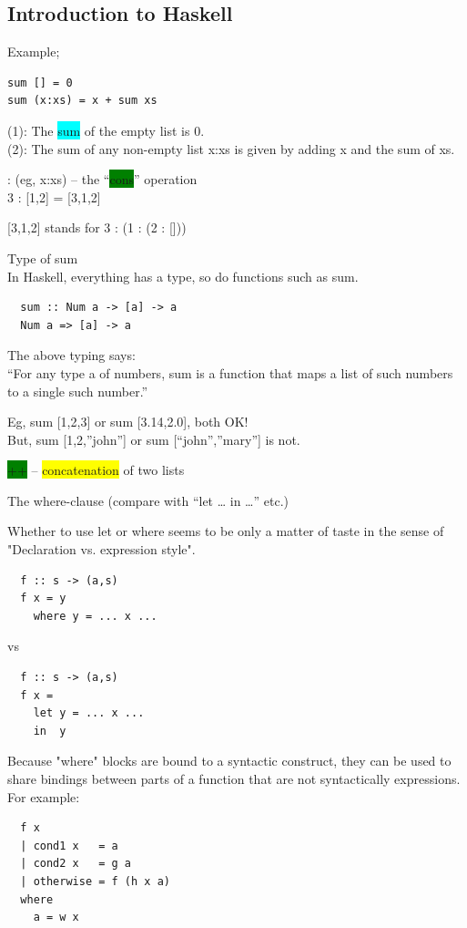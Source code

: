 \documentclass[tikz,border=10pt]{project_plan}
\begin{document}
\subsection{Introduction to Haskell}

Example;
\begin{lstlisting}
sum [] = 0
sum (x:xs) = x + sum xs
\end{lstlisting}
(1): The \colorbox{cyan}{sum} of the empty list is 0.\\
(2): The sum of any non-empty list x:xs is given by adding x and the sum of xs.

: (eg, x:xs) – the “\colorbox{green}{cons}” operation\\
3 : [1,2] = [3,1,2]

[3,1,2] stands for 3 : (1 : (2 : []))

Type of sum\\
In Haskell, everything has a type, so do functions such as sum.\\
\begin{lstlisting}
  sum :: Num a -> [a] -> a
  Num a => [a] -> a
\end{lstlisting}

The above typing says:\\
“For any type a of numbers, sum is a function that maps a
list of such numbers to a single such number.”

Eg, sum [1,2,3] or sum [3.14,2.0], both OK!\\
But, sum [1,2,”john”] or sum [“john”,”mary”] is not.

\colorbox{green}{++} – \colorbox{yellow}{concatenation} of two lists

The where-clause (compare with “let … in …” etc.)

Whether to use let or where seems to be only a matter of taste in the sense of
"Declaration vs. expression style".

\begin{lstlisting}
  f :: s -> (a,s)
  f x = y
    where y = ... x ...
\end{lstlisting}
vs
\begin{lstlisting}
  f :: s -> (a,s)
  f x =
    let y = ... x ...
    in  y
\end{lstlisting}

Because "where" blocks are bound to a syntactic construct, they can be used to share bindings between
parts of a function that are not syntactically expressions. For example:


\begin{lstlisting}
  f x
  | cond1 x   = a
  | cond2 x   = g a
  | otherwise = f (h x a)
  where
    a = w x
\end{lstlisting}
\end{document}
